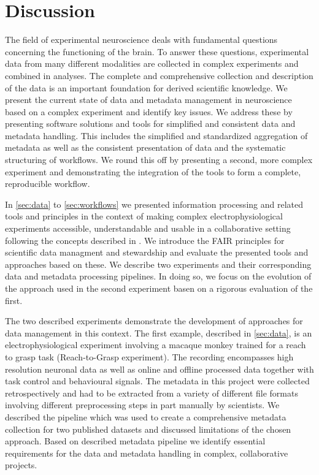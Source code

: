 \clearpage
\chapter{Discussion}
\label{sec:discussion}

The field of experimental neuroscience deals with fundamental questions concerning the functioning of the brain. To answer these questions, experimental data from many different modalities are collected in complex experiments and combined in analyses. The complete and comprehensive collection and description of the data is an important foundation for derived scientific knowledge. We present the current state of data and metadata management in neuroscience based on a complex experiment and identify key issues. We address these by presenting software solutions and tools for simplified and consistent data and metadata handling. This includes the simplified and standardized aggregation of metadata as well as the consistent presentation of data and the systematic structuring of workflows. We round this off by presenting a second, more complex experiment and demonstrating the integration of the tools to form a complete, reproducible workflow.

In \cref{sec:data} to \cref{sec:workflows} we presented information processing and related tools and principles in the context of making complex electrophysiological experiments accessible, understandable and usable in a collaborative setting following the concepts described in \citet{Zehl_2016, Zehl_2018}. We introduce the FAIR principles for scientific data managment and stewardship and evaluate the presented tools and approaches based on these. We describe two experiments and their corresponding data and metadata processing pipelines. In doing so, we focus on the evolution of the approach used in the second experiment basen on a rigorous evaluation of the first.

The two described experiments demonstrate the development of approaches for data management in this context. The first example, described in \cref{sec:data}, is an electrophysiological experiment involving a macaque monkey trained for a reach to grasp task (Reach-to-Grasp experiment). The recording encompasses high resolution neuronal data as well as online and offline processed data together with task control and behavioural signals. The metadata in this project were collected retrospectively and had to be extracted from a variety of different file formats involving different preprocessing steps in part manually by scientists. We described the pipeline which was used to create a comprehensive metadata collection for two published datasets and discussed limitations of the chosen approach. Based on described metadata pipeline we identify essential requirements for the data and metadata handling in complex, collaborative projects.

